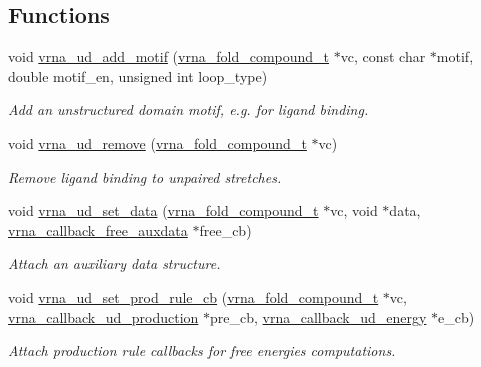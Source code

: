 \subsection*{Functions}
\begin{DoxyCompactItemize}
\item 
void \hyperlink{group__domains__up_gaec0c3313fb2951946614f920d289829a}{vrna\+\_\+ud\+\_\+add\+\_\+motif} (\hyperlink{group__fold__compound_ga1b0cef17fd40466cef5968eaeeff6166}{vrna\+\_\+fold\+\_\+compound\+\_\+t} $\ast$vc, const char $\ast$motif, double motif\+\_\+en, unsigned int loop\+\_\+type)
\begin{DoxyCompactList}\small\item\em Add an unstructured domain motif, e.\+g. for ligand binding. \end{DoxyCompactList}\item 
void \hyperlink{group__domains__up_gada59cb0c498b812eadd010811af3f2d4}{vrna\+\_\+ud\+\_\+remove} (\hyperlink{group__fold__compound_ga1b0cef17fd40466cef5968eaeeff6166}{vrna\+\_\+fold\+\_\+compound\+\_\+t} $\ast$vc)
\begin{DoxyCompactList}\small\item\em Remove ligand binding to unpaired stretches. \end{DoxyCompactList}\item 
void \hyperlink{group__domains__up_gac1f18c312b91d80089534a87d956e58b}{vrna\+\_\+ud\+\_\+set\+\_\+data} (\hyperlink{group__fold__compound_ga1b0cef17fd40466cef5968eaeeff6166}{vrna\+\_\+fold\+\_\+compound\+\_\+t} $\ast$vc, void $\ast$data, \hyperlink{group__fold__compound_ga7806651f51b195013839a218b3bbd5a3}{vrna\+\_\+callback\+\_\+free\+\_\+auxdata} $\ast$free\+\_\+cb)
\begin{DoxyCompactList}\small\item\em Attach an auxiliary data structure. \end{DoxyCompactList}\item 
void \hyperlink{group__domains__up_ga745a99f0bc72898d54de16f6e538828a}{vrna\+\_\+ud\+\_\+set\+\_\+prod\+\_\+rule\+\_\+cb} (\hyperlink{group__fold__compound_ga1b0cef17fd40466cef5968eaeeff6166}{vrna\+\_\+fold\+\_\+compound\+\_\+t} $\ast$vc, \hyperlink{group__domains__up_ga4fdfc02c1b660c07f2d887772f02a0a1}{vrna\+\_\+callback\+\_\+ud\+\_\+production} $\ast$pre\+\_\+cb, \hyperlink{group__domains__up_ga75825c57d0bfde4ae4f95c044260c5c3}{vrna\+\_\+callback\+\_\+ud\+\_\+energy} $\ast$e\+\_\+cb)
\begin{DoxyCompactList}\small\item\em Attach production rule callbacks for free energies computations. \end{DoxyCompactList}\item 

\end{DoxyCompactItemize}
